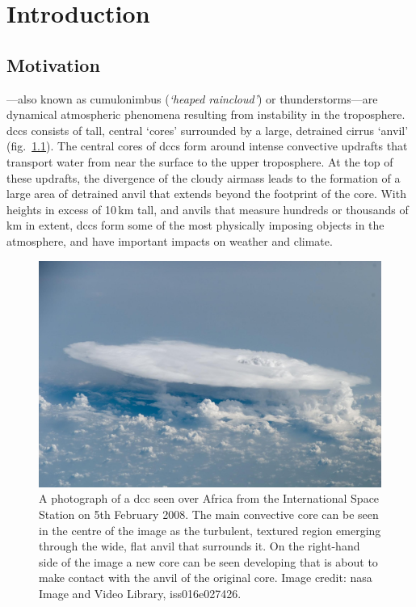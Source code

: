 \chapter{Introduction} \label{chp:introduction}

\section{Motivation}

---also known as cumulonimbus (\textit{`heaped raincloud'}) or thunderstorms---are dynamical atmospheric phenomena resulting from instability in the troposphere.
\acrshort{dcc}s consists of tall, central `cores' surrounded by a large, detrained cirrus `anvil' (fig.~\ref{fig:cb_photo}).
The central cores of \acrshort{dcc}s form around intense convective updrafts that transport water from near the surface to the upper troposphere.
At the top of these updrafts, the divergence of the cloudy airmass leads to the formation of a large area of detrained anvil that extends beyond the footprint of the core.
With heights in excess of 10\,\unit{km} tall, and anvils that measure hundreds or thousands of km in extent, \acrshort{dcc}s form some of the most physically imposing objects in the atmosphere, and have important impacts on weather and climate.

\begin{figure}[tp]
    \centering
    \includegraphics[width=\textwidth]{figures/cumulonimbus_nasa.jpg}
    \caption[
    A photograph of a \acrshort{dcc} seen over Africa from the ISS
    ]{
    A photograph of a \acrshort{dcc} seen over Africa from the International Space Station on 5th February 2008. The main convective core can be seen in the centre of the image as the turbulent, textured region emerging through the wide, flat anvil that surrounds it. On the right-hand side of the image a new core can be seen developing that is about to make contact with the anvil of the original core. Image credit: \acrshort{nasa} Image and Video Library, iss016e027426.
    }
    \label{fig:cb_photo}
\end{figure}

